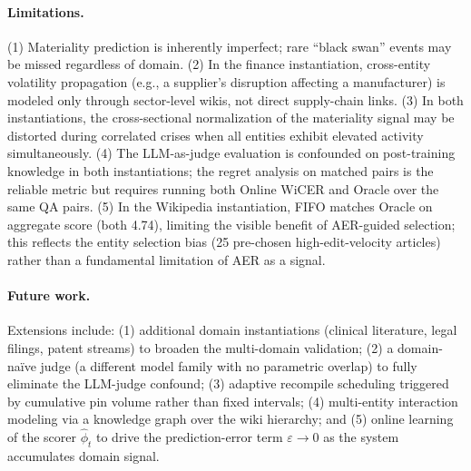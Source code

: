 \documentclass{article}
\begin{document}
\paragraph{Limitations.}
(1) Materiality prediction is inherently imperfect; rare ``black swan'' events may be missed regardless of domain.
(2) In the finance instantiation, cross-entity volatility propagation (e.g., a supplier's disruption affecting a manufacturer) is modeled only through sector-level wikis, not direct supply-chain links.
(3) In both instantiations, the cross-sectional normalization of the materiality signal may be distorted during correlated crises when all entities exhibit elevated activity simultaneously.
(4) The LLM-as-judge evaluation is confounded on post-training knowledge in both instantiations; the regret analysis on matched pairs is the reliable metric but requires running both Online WiCER and Oracle over the same QA pairs.
(5) In the Wikipedia instantiation, FIFO matches Oracle on aggregate score (both 4.74), limiting the visible benefit of AER-guided selection; this reflects the entity selection bias (25 pre-chosen high-edit-velocity articles) rather than a fundamental limitation of AER as a signal.

\paragraph{Future work.}
Extensions include: (1) additional domain instantiations (clinical literature, legal filings, patent streams) to broaden the multi-domain validation; (2) a domain-naïve judge (a different model family with no parametric overlap) to fully eliminate the LLM-judge confound; (3) adaptive recompile scheduling triggered by cumulative pin volume rather than fixed intervals; (4) multi-entity interaction modeling via a knowledge graph over the wiki hierarchy; and (5) online learning of the scorer $\hat{\phi}_t$ to drive the prediction-error term $\varepsilon \to 0$ as the system accumulates domain signal.
\end{document}
